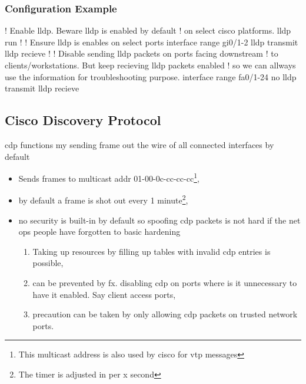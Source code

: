 \subsubsection*{Configuration Example}

\begin{cisco}
! Enable lldp. Beware lldp is enabled by default
! on select cisco platforms.
lldp run
!
! Ensure lldp is enables on select ports
interface range gi0/1-2
 lldp transmit
 lldp recieve
!
! Disable sending lldp packets on ports facing downstream
! to clients/workstations. But keep recieving lldp packets enabled
! so we can allways use the information for troubleshooting purpose.
interface range fa0/1-24
 no lldp transmit
 lldp recieve
\end{cisco}

\newpage

\subsection[CDP]{Cisco Discovery Protocol}


\gls{cdp} functions my sending frame out the wire of all connected interfaces by default
\begin{itemize}
    \item Sends frames to multicast addr 01-00-0c-cc-cc-cc\footnote{This multicast address is also used by cisco for \gls{vtp} messages},
    \item by default a frame is shot out every 1 minute\footnote{The timer is adjusted in per x second},
    \item no security is built-in by default so spoofing \gls{cdp} packets is not hard if the net ops people have forgotten to basic hardening
    \begin{enumerate}
        \item Taking up resources by filling up tables with invalid \gls{cdp} entries\cite{wiki:CDP_Spoofing} is possible,
        \item can be prevented by fx. disabling \gls{cdp} on ports where is it unnecessary to have it enabled. Say client access ports,
        \item precaution can be taken by only allowing \gls{cdp} packets on trusted network ports.
    \end{enumerate}
\end{itemize}

